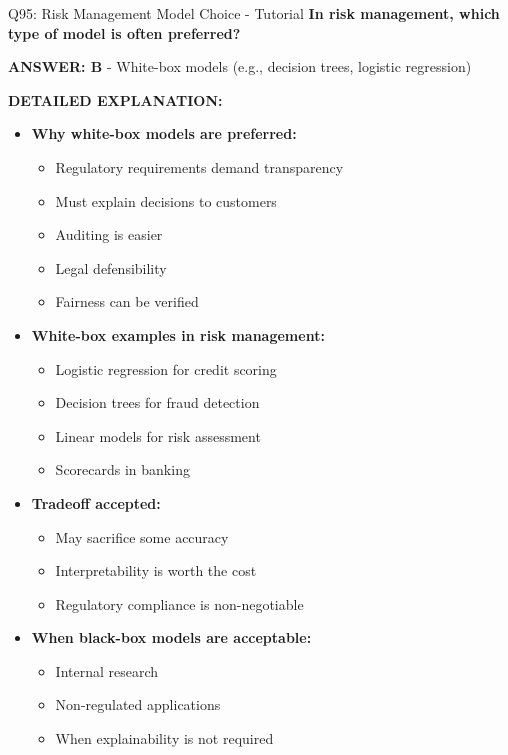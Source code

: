 \documentclass[8pt]{beamer}
\begin{document}
	\begin{frame}{Q95: Risk Management Model Choice - Tutorial}
		\fontsize{6.5}{7.5}\selectfont
		\textbf{In risk management, which type of model is often preferred?}
		
		\vspace{0.05cm}
		\textcolor{myblue}{\textbf{ANSWER: B}} - White-box models (e.g., decision trees, logistic regression)
		
		\vspace{0.05cm}
		\textbf{DETAILED EXPLANATION:}
		\begin{itemize}
			\item \textbf{Why white-box models are preferred:}
			\begin{itemize}
				\item Regulatory requirements demand transparency
				\item Must explain decisions to customers
				\item Auditing is easier
				\item Legal defensibility
				\item Fairness can be verified
			\end{itemize}
			\item \textbf{White-box examples in risk management:}
			\begin{itemize}
				\item Logistic regression for credit scoring
				\item Decision trees for fraud detection
				\item Linear models for risk assessment
				\item Scorecards in banking
			\end{itemize}
			\item \textbf{Tradeoff accepted:}
			\begin{itemize}
				\item May sacrifice some accuracy
				\item Interpretability is worth the cost
				\item Regulatory compliance is non-negotiable
			\end{itemize}
			\item \textbf{When black-box models are acceptable:}
			\begin{itemize}
				\item Internal research
				\item Non-regulated applications
				\item When explainability is not required
			\end{itemize}
		\end{itemize}
		

\end{frame}
\end{document}
